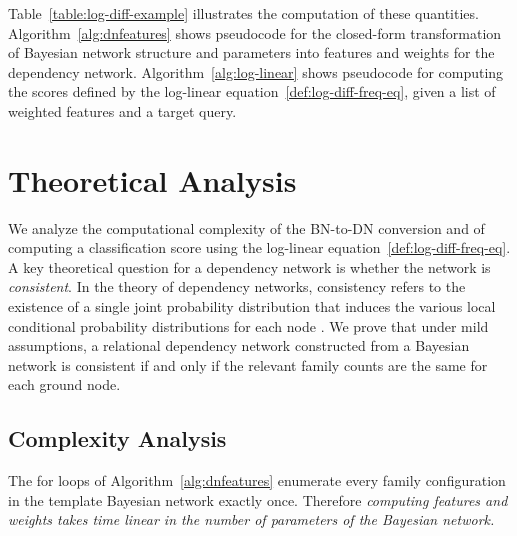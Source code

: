 \documentclass[runningheads,a4paper]{llncs}
\begin{document}
Table~\ref{table:log-diff-example} illustrates the computation of these quantities.
Algorithm~\ref{alg:dnfeatures} shows pseudocode for the closed-form transformation of Bayesian network structure and parameters into features and weights for the dependency network. Algorithm~\ref{alg:log-linear} shows pseudocode for computing the scores defined by the log-linear equation~\ref{def:log-diff-freq-eq}, given a list of weighted features and a target query. 



\section{Theoretical Analysis}
We analyze the computational complexity of the BN-to-DN conversion and of computing a classification score using the log-linear equation~\ref{def:log-diff-freq-eq}. A key theoretical question for a dependency network is whether the network is {\em consistent}. In the theory of dependency networks, consistency refers to the existence of a single joint probability distribution that induces the various local conditional probability distributions for each node \cite{Heckerman2000}. We prove that under mild assumptions, a relational dependency network constructed from a Bayesian network is consistent if and only if the relevant family counts are the same for each ground node. 
 

\subsection{Complexity Analysis}

The for loops of Algorithm~\ref{alg:dnfeatures} enumerate every family configuration in the template Bayesian network exactly once. Therefore {\em computing features and weights takes time linear in the number of parameters of the Bayesian network.} 
\end{document}
